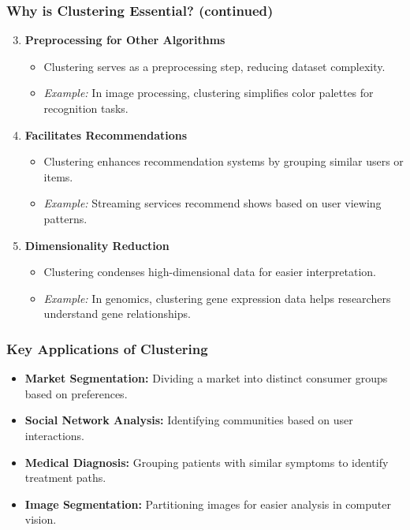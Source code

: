 \documentclass[aspectratio=169]{beamer}
\begin{document}
\begin{frame}[fragile]
    \frametitle{Why is Clustering Essential? (continued)}
    \begin{enumerate}
        \setcounter{enumi}{2}  %
        \item \textbf{Preprocessing for Other Algorithms}
        \begin{itemize}
            \item Clustering serves as a preprocessing step, reducing dataset complexity.
            \item \textit{Example:} In image processing, clustering simplifies color palettes for recognition tasks.
        \end{itemize}
        
        \item \textbf{Facilitates Recommendations}
        \begin{itemize}
            \item Clustering enhances recommendation systems by grouping similar users or items.
            \item \textit{Example:} Streaming services recommend shows based on user viewing patterns.
        \end{itemize}
        
        \item \textbf{Dimensionality Reduction}
        \begin{itemize}
            \item Clustering condenses high-dimensional data for easier interpretation.
            \item \textit{Example:} In genomics, clustering gene expression data helps researchers understand gene relationships.
        \end{itemize}
    \end{enumerate}
\end{frame}

\begin{frame}[fragile]
    \frametitle{Key Applications of Clustering}
    \begin{itemize}
        \item \textbf{Market Segmentation:} Dividing a market into distinct consumer groups based on preferences.
        
        \item \textbf{Social Network Analysis:} Identifying communities based on user interactions.
        
        \item \textbf{Medical Diagnosis:} Grouping patients with similar symptoms to identify treatment paths.
        
        \item \textbf{Image Segmentation:} Partitioning images for easier analysis in computer vision.
    \end{itemize}
\end{frame}
\end{document}

